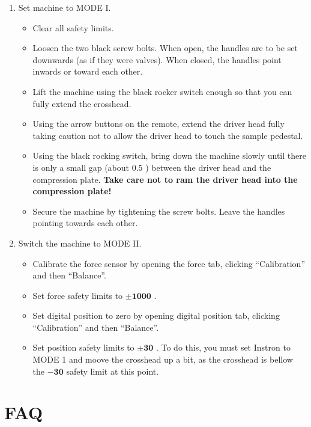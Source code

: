 \documentclass[a4paper]{article}
\begin{document}
\begin{enumerate}
  \item Set machine to \textsf{MODE I}.
  \begin{itemize}
    \item Clear all safety limits.
    \item Loosen the two black screw bolts. When open, the handles are to be set downwards (as if they were valves). When closed, the handles point inwards or toward each other.
    \item Lift the machine using the black rocker switch enough so that you can fully extend the crosshead.
    \item Using the arrow buttons on the remote, extend the driver head fully taking caution not to allow the driver head to touch the sample pedestal.
    \item Using the black rocking switch, bring down the machine slowly until there is only a small gap (about $0.5$ \milli\meter) between the driver head and the compression plate. {\bf Take care not to ram the driver head into the compression plate!}
    \item Secure the machine by tightening the screw bolts. Leave the handles pointing towards each other.
  \end{itemize}
  \item Switch the machine to \textsf{MODE II}.
  \begin{itemize}  
    \item Calibrate the force sensor by opening the force tab, clicking ``Calibration'' and then ``Balance''.
    \item Set force safety limits to $\mathbf{\pm 1000}$ {\bf\newton}.
    \item Set digital position to zero by opening digital position tab, clicking ``Calibration'' and then ``Balance''.
    \item Set position safety limits to $\mathbf{\pm 30}$ {\bf\milli\meter}. To do this, you must set Instron to \textsf{MODE 1} and moove the crosshead up a bit, as the crosshead is bellow the $\mathbf{-30}$ {\bf\milli\meter} safety limit at this point.
  \end{itemize}
\end{enumerate}

\clearpage

\section{FAQ}
\end{document}
